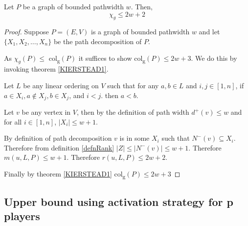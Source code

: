 \begin{theorem}
    Let $P$ be a graph of bounded pathwidth $w$. Then, 
    \[\chi_g \leq 2w + 2\]
    
\end{theorem}

\begin{proof}
    Suppose $P=(E,V)$ is a graph of bounded pathwidth $w$ and let $\{X_1,X_2,\dots,X_n\}$ be the path decomposition of $P$.
    
    As $\chi_g(P) \leq$ col\textsubscript{g}$(P)$ it suffices to show col\textsubscript{g}$(P) \leq 2w + 3$. We do this by invoking theorem \ref{KIERSTEAD1}.
        
    Let $L$ be any linear ordering on $V$ such that for any $a,b \in L$ and $i,j\in [1,n]$, if $a \in X_i, a\notin X_j, b \in X_j$, and $i < j$.
    then  $a < b$.
    
    Let $v$ be any vertex in $V$, then by the definition of path width $d^+(v) \leq w$ and for all $i \in [1,n]$, $ \left| X_i \right| \leq w + 1 $. 
    
    
    
    
    By definition of path decomposition $v$ is in some $X_i$ such that $N^-(v) \subseteq X_i$. Therefore from definition \ref{defnRank} $\left| Z\right| \leq \left| N^-(v)\right| \leq w+1$. Therefore $m(u,L,P) \leq w+1$. Therefore $r(u,L,P) \leq 2w+2$. 
    
    Finally by theorem \ref{KIERSTEAD1} col\textsubscript{g}$(P) \leq 2w + 3$
    
\end{proof}

\subsection{Upper bound using activation strategy for p players}

